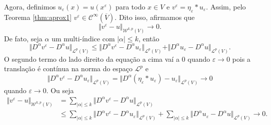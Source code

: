 \documentclass[a4paper, 11pt]{book}
\theoremstyle{definition}
\newcommand{\cC}{\mathcal{C}}
\newcommand{\cL}{\mathcal{L}}
\newcommand{\cW}{\mathcal{W}}
\begin{document}
\begin{prf}
    Agora, definimos $u_\varepsilon(x) = u(x^\varepsilon)$ para todo $x \in V$ e $v^\varepsilon = \eta_\varepsilon * u_\varepsilon$. Assim, pelo Teorema \ref{thm:aprox1} $v^\varepsilon \in \cC^{\infty}(\overline{V})$. 
    Dito isso, afirmamos que
    \[
        \Vert v^\varepsilon - u \Vert_{\cW^{k,p}(V)} \to 0.
    \]
    De fato, seja $\alpha $ um multi-índice com $|\alpha| \leqslant k$, então
    \[
        \Vert D^\alpha v^\varepsilon - D^\alpha u \Vert_{\cL^p(V)} \leqslant \Vert D^\alpha v^\varepsilon - D^\alpha u_\varepsilon \Vert_{\cL^p(V)} + \Vert D^\alpha u_\varepsilon - D^\alpha u \Vert_{\cL^p(V)}.
    \]
    O segundo termo do lado direito da equação a cima vaí a $0$ quando $\varepsilon \to 0$ pois a translação é contínua na norma do espaço $\cL^p$ e
    \[
        \Vert D^\alpha v^\varepsilon - D^\alpha u_\varepsilon \Vert_{\cL^p(V)} = \Vert D^\alpha (\eta_\varepsilon * u_\varepsilon) - u_\varepsilon \Vert_{\cL^p(V)} \to 0
    \]
    quando $\varepsilon \to 0$. Ou seja
    \[
        \begin{aligned}
            \Vert v^\varepsilon - u \Vert_{\cW^{k,p}(V)} &= \sum_{|\alpha| \leqslant k} \Vert D^\alpha v^\varepsilon - D^\alpha u \Vert_{\cL^p(V)} \\
            &\leqslant \sum_{|\alpha| \leqslant k} \Vert D^\alpha v^\varepsilon - D^\alpha u_\varepsilon \Vert_{\cL^p(V)} + \sum_{|\alpha| \leqslant k} \Vert D^\alpha u_\varepsilon - D^\alpha u \Vert_{\cL^p(V)} \to 0.
        \end{aligned}
    \]


\end{prf}
\end{document}
